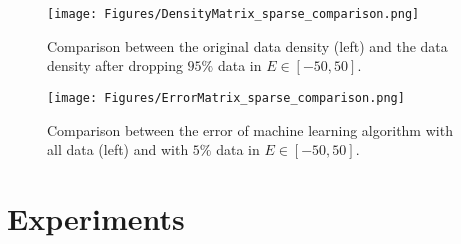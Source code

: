 \begin{figure}\label{fig:sparsedensitycomparison}
\begin{center}
\texttt{[image: Figures/DensityMatrix\_sparse\_comparison.png]} 
\end{center}
\caption{Comparison between the original data density (left) and the data density after dropping $95\%$ data in $E\in[-50,50]$.}
\end{figure}

\begin{figure}\label{fig:sparseerrorcomparison}
\begin{center}
\texttt{[image: Figures/ErrorMatrix\_sparse\_comparison.png]} 
\end{center}
\caption{Comparison between the error of machine learning algorithm with all data (left) and with $5\%$ data in $E\in[-50,50]$.}
\end{figure}

\chapter{Experiments}\label{ch:experiments}

